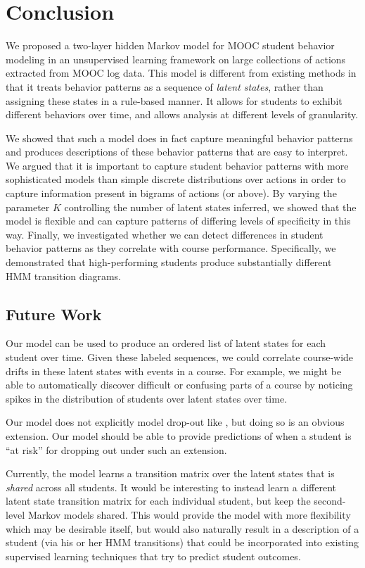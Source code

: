 \section{Conclusion}
We proposed a two-layer hidden Markov model for MOOC student behavior
modeling in an unsupervised learning framework on large collections of
actions extracted from MOOC log data. This model is different from existing
methods in that it treats behavior patterns as a sequence of \emph{latent
states}, rather than assigning these states in a rule-based manner. It
allows for students to exhibit different behaviors over time, and allows
analysis at different levels of granularity.

We showed that such a model does in fact capture meaningful behavior
patterns and produces descriptions of these behavior patterns that are easy
to interpret. We argued that it is important to capture student behavior
patterns with more sophisticated models than simple discrete distributions
over actions in order to capture information present in bigrams of actions
(or above). By varying the parameter $K$ controlling the number of latent
states inferred, we showed that the model is flexible and can capture
patterns of differing levels of specificity in this way.  Finally, we
investigated whether we can detect differences in student behavior patterns
as they correlate with course performance. Specifically, we demonstrated
that high-performing students produce substantially different HMM
transition diagrams.

\subsection{Future Work}

Our model can be used to produce an ordered list of latent states for each
student over time. Given these labeled sequences, we could correlate
course-wide drifts in these latent states with events in a course. For
example, we might be able to automatically discover difficult or confusing
parts of a course by noticing spikes in the distribution of students over
latent states over time.

Our model does not explicitly model drop-out like
\citet{Kizilcec:2013:LAK}, but doing so is an obvious extension. Our model
should be able to provide predictions of when a student is ``at risk'' for
dropping out under such an extension.

Currently, the model learns a transition matrix over the latent states that
is \emph{shared} across all students. It would be interesting to instead
learn a different latent state transition matrix for each individual
student, but keep the second-level Markov models shared. This would provide
the model with more flexibility which may be desirable itself, but would
also naturally result in a description of a student (via his or her HMM
transitions) that could be incorporated into existing supervised learning
techniques that try to predict student outcomes.
